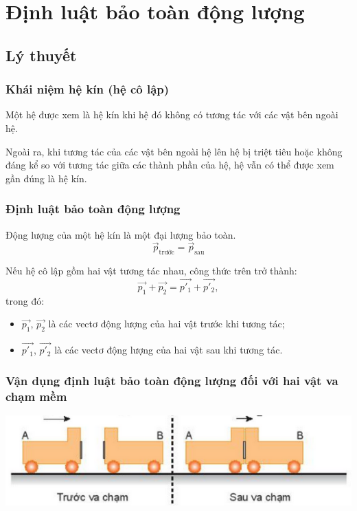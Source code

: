\let\lesson\undefined
\newcommand{\lesson}{\phantomlesson{Bài 19: Định luật bảo toàn động lượng.}}
\chapter[Định luật bảo toàn động lượng]{Định luật bảo toàn động lượng}
\setcounter{section}{0}
\section{Lý thuyết}
\subsection{Khái niệm hệ kín (hệ cô lập)}
Một hệ được xem là hệ kín khi hệ đó không có tương tác với các vật bên ngoài hệ.

Ngoài ra, khi tương tác của các vật bên ngoài hệ lên hệ bị triệt tiêu hoặc không đáng kể so với tương tác giữa các thành phần của hệ, hệ vẫn có thể được xem gần đúng là hệ kín.


\subsection{Định luật bảo toàn động lượng}
Động lượng của một hệ kín là một đại lượng bảo toàn.
\begin{equation*}
	\vec{p}_{\text{trước}}=\vec{p}_{\text{sau}}
\end{equation*}

Nếu hệ cô lập gồm hai vật tương tác nhau, công thức trên trở thành:
\begin{equation*}
	\vec{p_1}+\vec{p_2} = \vec{p'_1}+\vec{p'_2},
\end{equation*}
trong đó: 
\begin{itemize}
	\item $	\vec{p_1}$, $\vec{p_2}$ là các vectơ động lượng của hai vật trước khi tương tác;
	\item $	\vec{p'_1}$, $\vec{p'_2}$ là các vectơ động lượng của hai vật sau khi tương tác.
\end{itemize}
\subsection{Vận dụng định luật bảo toàn động lượng đối với hai vật va chạm mềm}
\begin{center}
	\includegraphics[scale=0.8]{../figs/G10-024-1}
\end{center}

